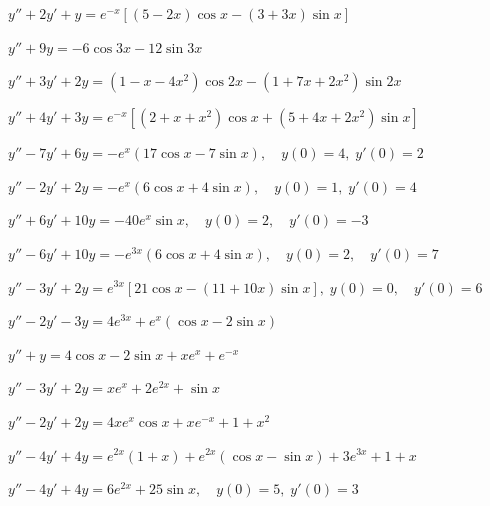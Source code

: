 \begin{exerciselist}
\item\label{exer:5.5.18}\CGex $y''+2y'+y=e^{-x}\left[(5-2x)\cos
x-(3+3x)\sin x\right]$

\item\label{exer:5.5.19}\CGex $y''+9y=-6\cos 3x-12\sin 3x$

\item\label{exer:5.5.20}\CGex $y''+3y'+2y=(1-x-4x^2)\cos2x-(1+7x+2x^2)\sin2x$

\item\label{exer:5.5.21}\CGex
$y''+4y'+3y=e^{-x}\left[(2+x+x^2)\cos x+(5+4x+2x^2)\sin x\right]$


\item\label{exer:5.5.22}$y''-7y'+6y=-e^x(17\cos x-7\sin x), \quad   y(0)=4,\;  y'(0)=2$

\item\label{exer:5.5.23}$y''-2y'+2y=-e^x(6\cos x+4\sin x), \quad   y(0)=1,\;  y'(0)=4$

\item\label{exer:5.5.24}$y''+6y'+10y=-40e^x\sin x, \quad  y(0)=2,\quad y'(0)=-3$

\item\label{exer:5.5.25}$y''-6y'+10y=-e^{3x}(6\cos x+4\sin
x), \quad  y(0)=2,\quad y'(0)=7$


\item\label{exer:5.5.26}$y''-3y'+2y=e^{3x}\left[21\cos x-(11+10x)\sin x\right],
\;  y(0)=0, \quad   y'(0)=6$


\item\label{exer:5.5.27}$y''-2y'-3y=4e^{3x}+e^x(\cos x-2\sin x)$
\item\label{exer:5.5.28}$y''+y=4\cos x-2\sin x+xe^x+e^{-x}$
\item\label{exer:5.5.29}$y''-3y'+2y=xe^x+2e^{2x}+\sin x$
\item\label{exer:5.5.30}$y''-2y'+2y=4xe^x\cos x+xe^{-x}+1+x^2$
\item\label{exer:5.5.31}$y''-4y'+4y=e^{2x}(1+x)+e^{2x}(\cos x-\sin
x)+3e^{3x}+1+x$


\item\label{exer:5.5.32}$y''-4y'+4y=6e^{2x}+25\sin x , \quad   y(0)=5,\;  y'(0)=3$




\end{exerciselist}
